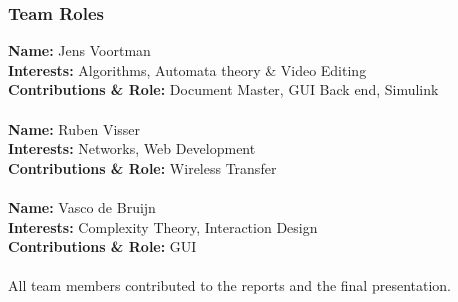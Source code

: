 \begin{small}
\subsubsection{Team Roles}
{\bfseries Name:} Jens Voortman\\
{\bfseries Interests:} Algorithms, Automata theory \& Video Editing\\
{\bfseries Contributions \& Role:} Document Master, GUI Back end, Simulink\\\\
{\bfseries Name:} Ruben Visser\\
{\bfseries Interests:} Networks, Web Development\\
{\bfseries Contributions \& Role:} Wireless Transfer\\\\
{\bfseries Name:} Vasco de Bruijn\\
{\bfseries Interests:} Complexity Theory, Interaction Design\\
{\bfseries Contributions \& Role:} GUI\\\\
All team members contributed to the reports and the final presentation.


\end{small}
